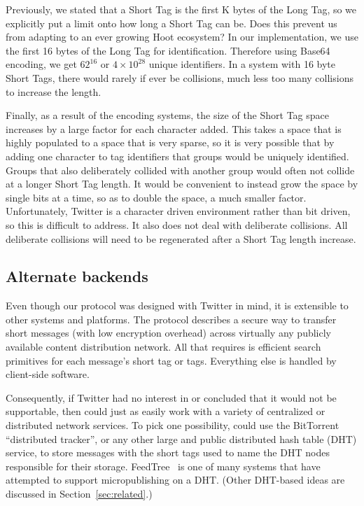 Previously, we stated that a Short Tag is the first K bytes of the Long Tag, so we explicitly put a limit onto how long a Short Tag can be. Does this prevent us from adapting to an ever growing Hoot ecosystem? In our implementation, we use the first 16 bytes of the Long Tag for identification. Therefore using Base64 encoding, we get $62^{16}$ or $4\times10^{28}$ unique identifiers. In a system with 16 byte Short Tags, there would rarely if ever be collisions, much less too many collisions to increase the length.

Finally, as a result of the encoding systems, the size of the Short Tag space increases by a large factor for each character added. This takes a space that is highly populated to a space that is very sparse, so it is very possible that by adding one character to tag identifiers that groups would be uniquely identified. Groups that also deliberately collided with another group would often not collide at a longer Short Tag length. It would be convenient to instead grow the space by single bits at a time, so as to double the space, a much smaller factor. Unfortunately, Twitter is a character driven environment rather than bit driven, so this is difficult to address. It also does not deal with deliberate collisions. All deliberate collisions will need to be regenerated after a Short Tag length increase.
\fi



\subsection{Alternate backends}
\label{sec:dht}

Even though our protocol was designed with Twitter in mind, it is extensible to other systems and platforms. The \hoot protocol describes a secure way to transfer short messages (with low encryption overhead) across virtually any publicly available content distribution network. All that \hoot requires is efficient search primitives for each message's short tag or tags. Everything else is handled by client-side software.

Consequently, if Twitter had no interest in \hoot or concluded that it would not be supportable, then \hoot could just as easily work with a variety of centralized or distributed network services. To pick one possibility, \hoot could use the BitTorrent ``distributed tracker'', or any other large and public distributed hash table (DHT) service, to store messages with the short tags used to name the DHT nodes responsible for their storage. FeedTree~\cite{sandler05feedtree} is one of many systems that have attempted to support micropublishing on a DHT. (Other DHT-based ideas are discussed in Section~\ref{sec:related}.) 
